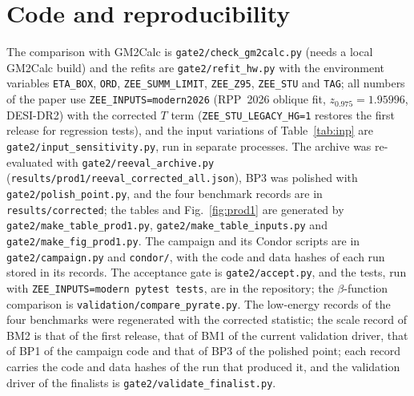 \documentclass[twocolumn,epjc3]{svjour3}
\begin{document}
\section{Code and reproducibility}
The comparison with GM2Calc is \texttt{gate2/check\_gm2calc.py} (needs a local GM2Calc build) and the refits are \texttt{gate2/refit\_hw.py} with the environment variables \texttt{ETA\_BOX}, \texttt{ORD}, \texttt{ZEE\_SUMM\_LIMIT}, \texttt{ZEE\_Z95}, \texttt{ZEE\_STU} and \texttt{TAG}; all numbers of the paper use \texttt{ZEE\_INPUTS=modern2026} (RPP~2026 oblique fit, $z_{0.975}=1.95996$, DESI-DR2) with the corrected $T$ term (\texttt{ZEE\_STU\_LEGACY\_HG=1} restores the first release for regression tests), and the input variations of Table~\ref{tab:inp} are \texttt{gate2/input\_sensitivity.py}, run in separate processes. The archive was re-evaluated with \texttt{gate2/reeval\_archive.py} (\texttt{results/prod1/reeval\_corrected\_all.json}), BP3 was polished with \texttt{gate2/polish\_point.py}, and the four benchmark records are in \texttt{results/corrected}; the tables and Fig.~\ref{fig:prod1} are generated by \texttt{gate2/make\_table\_prod1.py}, \texttt{gate2/make\_table\_inputs.py} and \texttt{gate2/make\_fig\_prod1.py}. The campaign and its Condor scripts are in \texttt{gate2/campaign.py} and \texttt{condor/}, with the code and data hashes of each run stored in its records. The acceptance gate is \texttt{gate2/accept.py}, and the tests, run with \texttt{ZEE\_INPUTS=modern pytest tests}, are in the repository; the $\beta$-function comparison is \texttt{validation/compare\_pyrate.py}. The low-energy records of the four benchmarks were regenerated with the corrected statistic; the scale record of BM2 is that of the first release, that of BM1 of the current validation driver, that of BP1 of the campaign code and that of BP3 of the polished point; each record carries the code and data hashes of the run that produced it, and the validation driver of the finalists is \texttt{gate2/validate\_finalist.py}.



\end{document}
